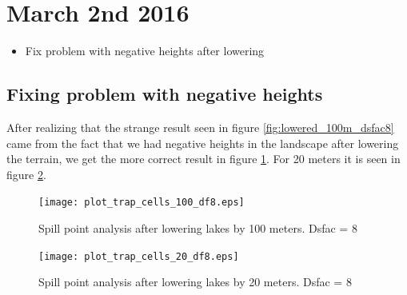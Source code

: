 \documentclass[10pt,a4paper]{article}
\begin{document}
\section{March 2nd 2016}
\begin{itemize}
\item Fix problem with negative heights after lowering
\end{itemize}

\subsection{Fixing problem with negative heights}
After realizing that the strange result seen in figure \ref{fig:lowered_100m_dsfac8} came from the fact that we had negative heights in the landscape after lowering the terrain, we get the more correct result in figure \ref{fig:trap_cells_100_ds8}. For 20 meters it is seen in figure \ref{fig:trap_cells_20_ds8}.

\begin{figure}[H]
  \centering
    \texttt{[image: plot\_trap\_cells\_100\_df8.eps]}
  \caption{Spill point analysis after lowering lakes by 100 meters. Dsfac = 8}
  \label{fig:trap_cells_100_ds8}
\end{figure}

\begin{figure}[H]
  \centering
    \texttt{[image: plot\_trap\_cells\_20\_df8.eps]}
  \caption{Spill point analysis after lowering lakes by 20 meters. Dsfac = 8}
  \label{fig:trap_cells_20_ds8}
\end{figure}
\end{document}
